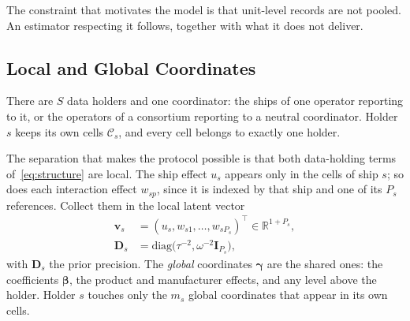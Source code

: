 The constraint that motivates the model is that unit-level records are not
pooled. An estimator respecting it follows, together with what it does not
deliver.

\subsection{Local and Global Coordinates}
There are $S$ data holders and one coordinator: the ships of one operator
reporting to it, or the operators of a consortium reporting to a neutral
coordinator. Holder $s$ keeps its own cells $\mathcal C_s$, and every cell
belongs to exactly one holder.

The separation that makes the protocol possible is that both data-holding
terms of~\eqref{eq:structure} are local. The ship effect $u_s$ appears only in
the cells of ship $s$; so does each interaction effect $w_{sp}$, since it is
indexed by that ship and one of its $P_s$ references. Collect them in the local
latent vector
\begin{align}
\mathbf v_s&=(u_s,w_{s1},\dots,w_{sP_s})^{\top}\in\mathbb R^{1+P_s},
\label{eq:local}\\
\mathbf D_s&=\mathrm{diag}\big(\tau^{-2},\omega^{-2}\mathbf I_{P_s}\big),
\label{eq:localb}
\end{align}
with $\mathbf D_s$ the prior precision. The \emph{global} coordinates
$\boldsymbol\gamma$ are the shared ones: the coefficients $\boldsymbol\beta$, the
product and manufacturer effects, and any level above the holder. Holder $s$
touches only the $m_s$ global coordinates that appear in its own cells.

